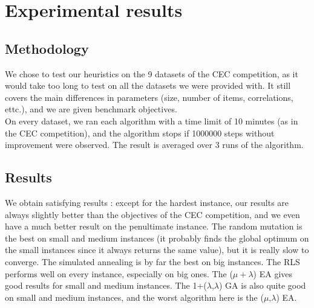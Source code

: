 \documentclass[a4paper]{article}
\begin{document}
\section{Experimental results}
\subsection{Methodology}
We chose to test our heuristics on the 9 datasets of the CEC competition, as it would take too long to test on all the datasets we were provided with. It still covers the main differences in parameters (size, number of items, correlations, ettc.), and we are given benchmark objectives. \\
On every dataset, we ran each algorithm with a time limit of 10 minutes (as in the CEC competition), and the algorithm stops if 1000000 steps without improvement  were observed. The result is averaged over 3 runs of the algorithm.
\subsection{Results}
We obtain satisfying results : except for the hardest instance, our results are always slightly better than the objectives of the CEC competition, and we even have a much better result on the penultimate instance. The random mutation is the best on small and medium instances (it probably finds the global optimum on the small instances since it always returns the same value), but it is really slow to converge. The simulated annealing is by far the best on big instances. The RLS performs well on every instance, especially on big ones. The ($\mu + \lambda$) EA gives good results for small and medium instances. The 1+($\lambda$,$\lambda$) GA is also quite good on small and medium instances, and the worst algorithm here is the ($\mu$,$\lambda$) EA.

\begin{center}
\end{center}

\begin{center}
\end{center}

\begin{center}
\end{center}
\end{document}
